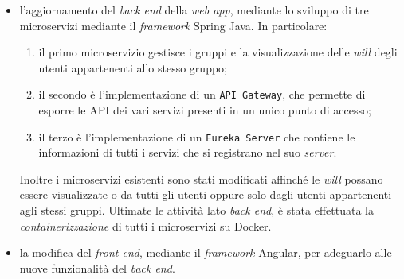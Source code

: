 \begin{itemize}
      \item l'aggiornamento del \textit{back
                  end} della \textit{web app}, mediante lo sviluppo di tre
            microservizi
            mediante il \textit{framework} Spring Java.
            In particolare:
            \begin{enumerate}
                  \item il primo microservizio	gestisce i gruppi e la
                        visualizzazione delle
                        \textit{will}
                        degli utenti appartenenti allo stesso gruppo;
                  \item il secondo è l'implementazione di un
                        \texttt{API Gateway}, che permette di esporre le
                        API dei vari servizi
                        presenti in un
                        unico punto di accesso;
                  \item il terzo è l'implementazione di un \texttt{Eureka
                              Server}
                        che
                        contiene le informazioni di tutti i servizi che si
                        registrano nel suo \textit{server}.
            \end{enumerate}
            Inoltre i microservizi esistenti sono stati modificati affinché le
            \textit{will} possano essere visualizzate o da tutti gli utenti
            oppure solo
            dagli utenti appartenenti agli stessi gruppi.
            Ultimate le attività lato \textit{back end}, è stata effettuata la
            \textit{containerizzazione} di tutti i microservizi su
            Docker.
      \item la modifica del \textit{front end},
            mediante il \textit{framework} Angular, per adeguarlo alle nuove
            funzionalità del
            \textit{back end}.
\end{itemize}

%
%

\endgroup

\vfill